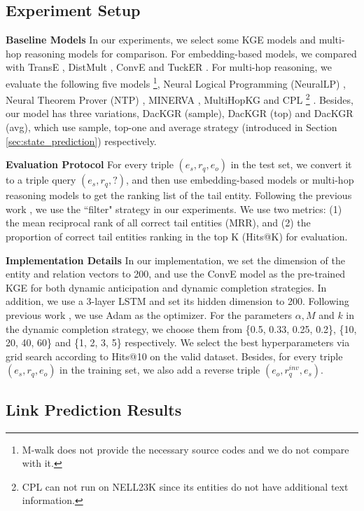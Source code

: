 \documentclass[11pt,a4paper]{article}
\begin{document}
\subsection{Experiment Setup}

\textbf{Baseline Models} \indent In our experiments, we select some KGE models and multi-hop reasoning models for comparison. For embedding-based models, we compared with TransE \cite{TransE}, DistMult \cite{DistMult}, ConvE \cite{ConvE} and TuckER \cite{TuckER}. For multi-hop reasoning, we evaluate the following five models \footnote{M-walk does not provide the necessary source codes and we do not compare with it.},  Neural Logical Programming (NeuralLP) \cite{NeuralLP},  Neural Theorem Prover (NTP) \cite{NTP}, MINERVA \cite{MINERVA}, MultiHopKG \cite{MultiHop} and CPL \footnote{CPL can not run on NELL23K since its entities do not have additional text information.} \cite{CPL} .
Besides, our model has three variations, DacKGR (sample), DacKGR (top) and DacKGR (avg), which use sample, top-one and average strategy (introduced in Section \ref{sec:state_prediction}) respectively.

\noindent \textbf{Evaluation Protocol} \indent For every triple $(e_s, r_q, e_o)$ in the test set, we convert it to a triple query $(e_s, r_q, ?)$, and then use embedding-based models or multi-hop reasoning models to get the ranking list of the tail entity. Following the previous work \cite{TransE}, we use the ``filter" strategy in our experiments.
We use two metrics: (1) the mean reciprocal rank of all correct tail entities (MRR), and (2) the proportion of correct tail entities ranking in the top K (Hits@K) for evaluation.


\noindent \textbf{Implementation Details} \indent In our implementation, we set the dimension of the entity and relation vectors to 200, and use the ConvE model as the pre-trained KGE for both dynamic anticipation and dynamic completion strategies. In addition, we use a 3-layer LSTM and set its hidden dimension to 200. Following previous work \cite{MINERVA}, we use Adam \cite{Adam} as the optimizer. For the parameters $\alpha, M$ and $k$ in the dynamic completion strategy, we choose them from \{0.5, 0.33, 0.25, 0.2\}, \{10, 20, 40, 60\} and \{1, 2, 3, 5\} respectively. We select the best hyperparameters via grid search according to Hits@10 on the valid dataset. Besides, for every triple $(e_s, r_q, e_o)$ in the training set, we also add a reverse triple $(e_o, r_q^{inv}, e_s)$.

\subsection{Link Prediction Results}
\end{document}
